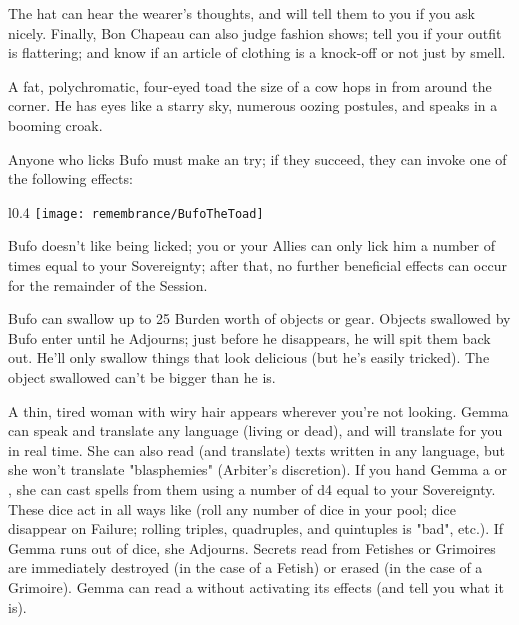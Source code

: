 The hat can hear the wearer's thoughts, and will tell them to you if you ask nicely.   Finally, Bon Chapeau can also judge fashion shows; tell you if your outfit is flattering; and know if an article of clothing is a knock-off or not just by smell.



A fat, polychromatic, four-eyed toad the size of a cow hops in from around the corner. He has eyes like a starry sky, numerous oozing postules, and speaks in a booming croak.

Anyone who licks Bufo must make an \INSANITY try; if they succeed, they can invoke one of the following effects:


\begin{wrapfigure}[11]{l}{0.4\textwidth}
    \texttt{[image: remembrance/BufoTheToad]}
\end{wrapfigure}



Bufo doesn't like being licked; you or your Allies can only lick him a number of times equal to your Sovereignty; after that, no further beneficial effects can occur for the remainder of the Session.



Bufo can swallow up to 25 Burden worth of objects or gear. Objects swallowed by Bufo enter  until he Adjourns; just before he disappears, he will spit them back out.  He'll only swallow things that look delicious (but he's easily tricked).  The object swallowed can't be bigger than he is.



A thin, tired woman with wiry hair appears wherever you're not looking. Gemma can speak and translate any language (living or dead), and will translate for you in real time. She can also read (and translate) texts written in any language, but she won't translate "blasphemies" (Arbiter's discretion). If you hand Gemma a  or , she can cast spells from them using a number of d4 equal to your Sovereignty. These dice act in all ways like  (roll any number of dice in your pool; dice disappear on Failure; rolling triples, quadruples, and quintuples is "bad", etc.). If Gemma runs out of dice, she Adjourns. Secrets read from Fetishes or Grimoires are immediately destroyed (in the case of a Fetish) or erased (in the case of a Grimoire). Gemma can read a  without activating its effects (and tell you what it is).

